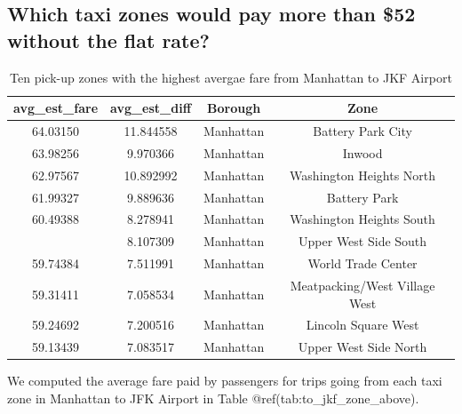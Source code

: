 \documentclass[12pt,twoside]{reedthesis}
\theoremstyle{definition}
\theoremstyle{definition}
\theoremstyle{definition}
\theoremstyle{remark}
\begin{document}
\subsection{Which taxi zones would pay more than \$52 without the flat
rate?}\label{which-taxi-zones-would-pay-more-than-52-without-the-flat-rate}
\begin{table}

\caption{\label{tab:unnamed-chunk-90}Ten pick-up zones with the highest avergae fare from Manhattan to JKF Airport}
\centering
\begin{tabular}[t]{cccc}
\toprule
avg\_est\_fare & avg\_est\_diff & Borough & Zone\\
\midrule
64.03150 & 11.844558 & Manhattan & Battery Park City\\
63.98256 & 9.970366 & Manhattan & Inwood\\
62.97567 & 10.892992 & Manhattan & Washington Heights North\\
61.99327 & 9.889636 & Manhattan & Battery Park\\
60.49388 & 8.278941 & Manhattan & Washington Heights South\\
\addlinespace
60.18006 & 8.107309 & Manhattan & Upper West Side South\\
59.74384 & 7.511991 & Manhattan & World Trade Center\\
59.31411 & 7.058534 & Manhattan & Meatpacking/West Village West\\
59.24692 & 7.200516 & Manhattan & Lincoln Square West\\
59.13439 & 7.083517 & Manhattan & Upper West Side North\\
\bottomrule
\end{tabular}
\end{table}
We computed the average fare paid by passengers for trips going from
each taxi zone in Manhattan to JFK Airport in Table
@ref(tab:to\_jkf\_zone\_above).
\end{document}

